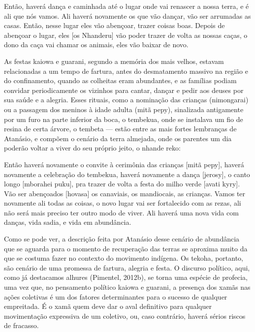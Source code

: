 \documentclass{article}
\begin{document}
Ent\~ao, haver\'a dan\c{c}a e caminhada at\'e o lugar onde vai renascer
a nossa terra, e \'e ali que n\'os vamos. Ali haver\'a novamente os que
v\~ao dan\c{c}ar, v\~ao ser arrumadas as casas. Ent\~ao, nesse lugar
eles v\~ao aben\c{c}oar, trazer coisas boas. Depois de aben\c{c}oar o
lugar, eles [os Nhanderu] v\~ao poder trazer de volta as nossas
ca\c{c}as, o dono da ca\c{c}a vai chamar os animais, eles v\~ao baixar
de novo.

As festas kaiowa e guarani, segundo a mem\'oria dos mais velhos, estavam
relacionadas a um tempo de fartura, antes do desmatamento massivo na
regi\~ao e do confinamento, quando as colheitas eram abundantes, e as
fam\'ilias podiam convidar periodicamente os vizinhos para cantar,
dan\c{c}ar e pedir aos deuses por sua sa\'ude e a alegria. Esses
rituais, como a nomina\c{c}\~ao das crian\c{c}as (nimongarai) ou a
passagem dos meninos \`a idade adulta (mit\~a pepy), sinalizada
antigamente por um furo na parte inferior da boca, o tembekua, onde se
instalava um fio de resina de certa \'arvore, o tembeta --- est\~ao
entre as mais fortes lembran\c{c}as de Atan\'asio, e comp\~oem o
cen\'ario da terra almejada, onde os parentes um dia poder\~ao voltar a
viver do seu pr\'oprio jeito, o nhande reko:

Ent\~ao haver\'a novamente o convite \`a cerim\^onia das crian\c{c}as
[mit\~a pepy], haver\'a novamente a celebra\c{c}\~ao do tembekua,
haver\'a novamente a dan\c{c}a [jerosy], o canto longo [mborahei puku],
pra trazer de volta a festa do milho verde [avati kyry]. V\~ao ser
aben\c{c}oados [hovasa] os canaviais, os mandiocais, as crian\c{c}as.
Vamos ter novamente ali todas as coisas, o novo lugar vai ser
fortalecido com as rezas, ali n\~ao ser\'a mais preciso ter outro modo
de viver. Ali haver\'a uma nova vida com dan\c{c}as, vida sadia, e vida
em abund\^ancia.

Como se pode ver, a descri\c{c}\~ao feita por Atan\'asio desse cen\'ario
de abund\^ancia que se aguarda para o momento de recupera\c{c}\~ao das
terras se aproxima muito da que se costuma fazer no contexto do
movimento ind\'igena. Os tekoha, portanto, s\~ao cen\'ario de uma
promessa de fartura, alegria e festa. O discurso pol\'itico, aqui, como
j\'a destacamos alhures (Pimentel, 2012b), se torna uma esp\'ecie de
profecia, uma vez que, no pensamento pol\'itico kaiowa e guarani, a
presen\c{c}a dos xam\~as nas a\c{c}\~oes coletivas \'e um dos fatores
determinantes para o sucesso de qualquer empreitada. \'E o xam\~a quem
deve dar o aval definitivo para qualquer movimenta\c{c}\~ao expressiva
de um coletivo, ou, caso contr\'ario, haver\'a s\'erios riscos de
fracasso. 
\end{document}
